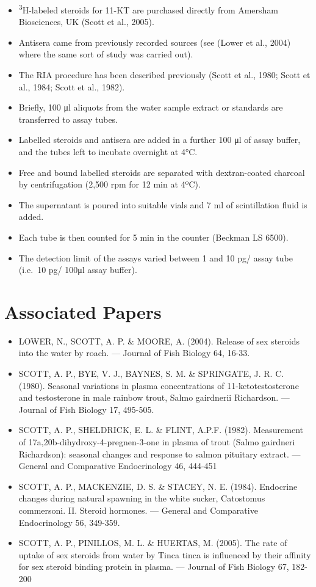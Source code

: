 \documentclass[
  letterpaper,
  DIV=11,
  numbers=noendperiod]{scrreprt}
\providecommand{\tightlist}{%
  \setlength{\itemsep}{0pt}\setlength{\parskip}{0pt}}\usepackage{longtable,booktabs,array}
\begin{document}
\begin{itemize}
\tightlist
\item
  \textsuperscript{3}H-labeled steroids for 11-KT are purchased directly
  from Amersham Biosciences, UK (Scott et al., 2005).
\item
  Antisera came from previously recorded sources (see (Lower et al.,
  2004) where the same sort of study was carried out).
\item
  The RIA procedure has been described previously (Scott et al., 1980;
  Scott et al., 1984; Scott et al., 1982).
\item
  Briefly, 100 μl aliquots from the water sample extract or standards
  are transferred to assay tubes.
\item
  Labelled steroids and antisera are added in a further 100 μl of assay
  buffer, and the tubes left to incubate overnight at 4°C.
\item
  Free and bound labelled steroids are separated with dextran-coated
  charcoal by centrifugation (2,500 rpm for 12 min at 4ºC).
\item
  The supernatant is poured into suitable vials and 7 ml of
  scintillation fluid is added.
\item
  Each tube is then counted for 5 min in the counter (Beckman LS 6500).
\item
  The detection limit of the assays varied between 1 and 10 pg/ assay
  tube (i.e.~10 pg/ 100μl assay buffer).
\end{itemize}

\hypertarget{associated-papers-53}{%
\section{Associated Papers}\label{associated-papers-53}}

\begin{itemize}
\tightlist
\item
  LOWER, N., SCOTT, A. P. \& MOORE, A. (2004). Release of sex steroids
  into the water by roach. --- Journal of Fish Biology 64, 16-33.
\item
  SCOTT, A. P., BYE, V. J., BAYNES, S. M. \& SPRINGATE, J. R. C. (1980).
  Seasonal variations in plasma concentrations of 11-ketotestosterone
  and testosterone in male rainbow trout, Salmo gairdnerii Richardson.
  --- Journal of Fish Biology 17, 495-505.
\item
  SCOTT, A. P., SHELDRICK, E. L. \& FLINT, A.P.F. (1982). Measurement of
  17a,20b-dihydroxy-4-pregnen-3-one in plasma of trout (Salmo gairdneri
  Richardson): seasonal changes and response to salmon pituitary
  extract. --- General and Comparative Endocrinology 46, 444-451
\item
  SCOTT, A. P., MACKENZIE, D. S. \& STACEY, N. E. (1984). Endocrine
  changes during natural spawning in the white sucker, Catostomus
  commersoni. II. Steroid hormones. --- General and Comparative
  Endocrinology 56, 349-359.
\item
  SCOTT, A. P., PINILLOS, M. L. \& HUERTAS, M. (2005). The rate of
  uptake of sex steroids from water by Tinca tinca is influenced by
  their affinity for sex steroid binding protein in plasma. --- Journal
  of Fish Biology 67, 182-200
\end{itemize}
\end{document}
